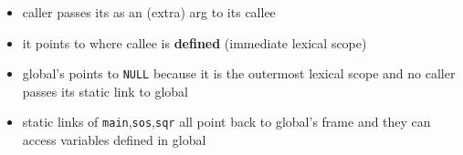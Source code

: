 \documentclass[10pt,a4paper,landscape]{article}
\begin{document}
\begin{multicols*}{3}
\begin{minipage}{\linewidth}
\end{minipage}
\begin{itemize}
\item caller passes its  as an (extra) arg to its callee
\item it points to where callee is \textbf{defined} (immediate lexical scope)
\item global's  points to \texttt{NULL} because it is the outermost lexical scope and no caller passes its static link to global
\item static links of \texttt{main},\texttt{sos},\texttt{sqr} all point back to global's frame and they can access variables defined in global
\end{itemize}


\end{multicols*}
\end{document}
